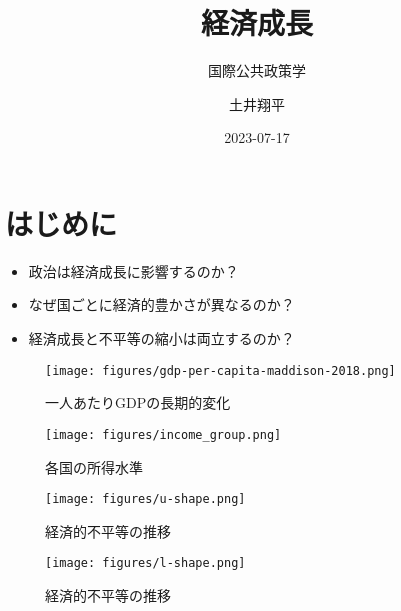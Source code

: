 \documentclass[
  xelatex,
  ja=standard]{bxjsarticle}
\title{経済成長}
\subtitle{国際公共政策学}
\author{土井翔平}
\date{2023-07-17}
\providecommand{\tightlist}{%
  \setlength{\itemsep}{0pt}\setlength{\parskip}{0pt}}\usepackage{longtable,booktabs,array}
\begin{document}
\maketitle
\ifdefined\Shaded\renewenvironment{Shaded}{\begin{tcolorbox}[borderline west={3pt}{0pt}{shadecolor}, breakable, interior hidden, frame hidden, sharp corners, enhanced, boxrule=0pt]}{\end{tcolorbox}}\fi

\hypertarget{ux306fux3058ux3081ux306b}{%
\section*{はじめに}\label{ux306fux3058ux3081ux306b}}

\begin{itemize}
\tightlist
\item
  政治は経済成長に影響するのか？
\item
  なぜ国ごとに経済的豊かさが異なるのか？
\item
  経済成長と不平等の縮小は両立するのか？
\end{itemize}

\begin{figure}[htpb]

{\centering \texttt{[image: figures/gdp-per-capita-maddison-2018.png]}

}

\caption{一人あたりGDPの長期的変化}

\end{figure}

\begin{figure}[htpb]

{\centering \texttt{[image: figures/income\_group.png]}

}

\caption{各国の所得水準}

\end{figure}

\begin{figure}[htpb]

{\centering \texttt{[image: figures/u-shape.png]}

}

\caption{経済的不平等の推移}

\end{figure}

\begin{figure}[htpb]

{\centering \texttt{[image: figures/l-shape.png]}

}

\caption{経済的不平等の推移}

\end{figure}
\end{document}
